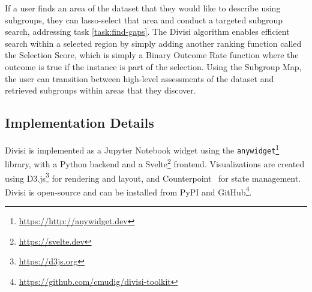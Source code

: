 If a user finds an area of the dataset that they would like to describe using subgroups, they can lasso-select that area and conduct a targeted subgroup search, addressing task \ref{task:find-gaps}.
The Divisi algorithm enables efficient search within a selected region by simply adding another ranking function called the Selection Score, which is simply a Binary Outcome Rate function where the outcome is true if the instance is part of the selection. %
Using the Subgroup Map, the user can transition between high-level assessments of the dataset and retrieved subgroups within areas that they discover.

\subsection{Implementation Details}

Divisi is implemented as a Jupyter Notebook widget using the \texttt{anywidget}\footnote{\url{https://http://anywidget.dev}} library, with a Python backend and a Svelte\footnote{\url{https://svelte.dev}} frontend.
Visualizations are created using D3.js\footnote{\url{https://d3js.org}} for rendering and layout, and Counterpoint~\cite{sivaraman_2024_counterpoint} for state management.
Divisi is open-source and can be installed from PyPI and GitHub\footnote{\url{https://github.com/cmudig/divisi-toolkit}}.
